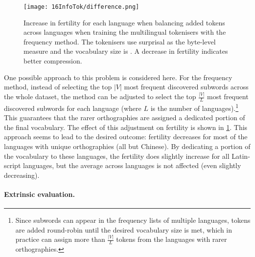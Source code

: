 \begin{figure}[!t]
    \centering
    \texttt{[image: 16InfoTok/difference.png]}
    \caption{Increase in fertility for each language when balancing added tokens across languages when training the multilingual \bytespan tokenisers with the frequency method. The tokenisers use surprisal as the byte-level measure and the vocabulary size is . A decrease in fertility indicates better compression.}
    \label{fig:16-difference}
\end{figure}

One possible approach to this problem is considered here. For the frequency method, instead of selecting the top $|V|$ most frequent discovered subwords across the whole dataset, the method can be adjusted to select the top $\frac{|V|}{L}$ most frequent discovered subwords for each language (where $L$ is the number of languages).\footnote{Since subwords can appear in the frequency lists of multiple languages, tokens are added round-robin until the desired vocabulary size is met, which in practice can assign more than $\frac{|V|}{L}$ tokens from the languages with rarer orthographies.} This guarantees that the rarer orthographies are assigned a dedicated portion of the final vocabulary. The effect of this adjustment on fertility is shown in \cref{fig:16-difference}. This approach seems to lead to the desired outcome: fertility decreases for most of the languages with unique orthographies (all but Chinese). By dedicating a portion of the vocabulary to these languages, the fertility does slightly increase for all Latin-script languages, but the average across languages is not affected (even slightly decreasing). 

\paragraph{Extrinsic evaluation.}

